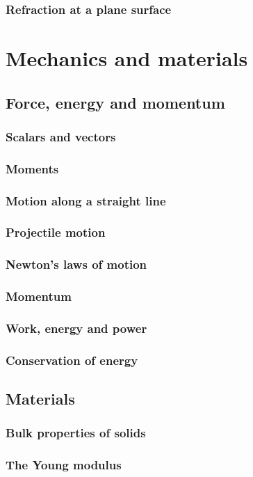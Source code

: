 \section{Refraction at a plane surface}


\part{Mechanics and materials}
\chapter{Force, energy and momentum}
\section{Scalars and vectors}
\section{Moments}
\section{Motion along a straight line}
\section{Projectile motion}
\section{Newton’s laws of motion}
\section{Momentum}
\section{Work, energy and power}
\section{Conservation of energy}

\chapter{Materials}
\section{Bulk properties of solids}
\section{The Young modulus}


